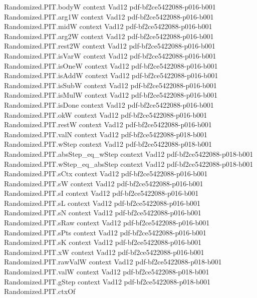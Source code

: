 \begin{theorem}
\proofstep
  {Randomized.PIT.bodyW}
  {context}
  {Vad12}
  {pdf-bf2ce5422088-p016-b001}
\proofstep
  {Randomized.PIT.arg1W}
  {context}
  {Vad12}
  {pdf-bf2ce5422088-p016-b001}
\proofstep
  {Randomized.PIT.midW}
  {context}
  {Vad12}
  {pdf-bf2ce5422088-p016-b001}
\proofstep
  {Randomized.PIT.arg2W}
  {context}
  {Vad12}
  {pdf-bf2ce5422088-p016-b001}
\proofstep
  {Randomized.PIT.rest2W}
  {context}
  {Vad12}
  {pdf-bf2ce5422088-p016-b001}
\proofstep
  {Randomized.PIT.isVarW}
  {context}
  {Vad12}
  {pdf-bf2ce5422088-p016-b001}
\proofstep
  {Randomized.PIT.isOneW}
  {context}
  {Vad12}
  {pdf-bf2ce5422088-p016-b001}
\proofstep
  {Randomized.PIT.isAddW}
  {context}
  {Vad12}
  {pdf-bf2ce5422088-p016-b001}
\proofstep
  {Randomized.PIT.isSubW}
  {context}
  {Vad12}
  {pdf-bf2ce5422088-p016-b001}
\proofstep
  {Randomized.PIT.isMulW}
  {context}
  {Vad12}
  {pdf-bf2ce5422088-p016-b001}
\proofstep
  {Randomized.PIT.isDone}
  {context}
  {Vad12}
  {pdf-bf2ce5422088-p016-b001}
\proofstep
  {Randomized.PIT.okW}
  {context}
  {Vad12}
  {pdf-bf2ce5422088-p016-b001}
\proofstep
  {Randomized.PIT.restW}
  {context}
  {Vad12}
  {pdf-bf2ce5422088-p016-b001}
\proofstep
  {Randomized.PIT.valN}
  {context}
  {Vad12}
  {pdf-bf2ce5422088-p018-b001}
\proofstep
  {Randomized.PIT.wStep}
  {context}
  {Vad12}
  {pdf-bf2ce5422088-p018-b001}
\proofstep
  {Randomized.PIT.absStep_eq_wStep}
  {context}
  {Vad12}
  {pdf-bf2ce5422088-p018-b001}
\proofstep
  {Randomized.PIT.wStep_eq_absStep}
  {context}
  {Vad12}
  {pdf-bf2ce5422088-p018-b001}
\proofstep
  {Randomized.PIT.sCtx}
  {context}
  {Vad12}
  {pdf-bf2ce5422088-p016-b001}
\proofstep
  {Randomized.PIT.sW}
  {context}
  {Vad12}
  {pdf-bf2ce5422088-p016-b001}
\proofstep
  {Randomized.PIT.sI}
  {context}
  {Vad12}
  {pdf-bf2ce5422088-p016-b001}
\proofstep
  {Randomized.PIT.sL}
  {context}
  {Vad12}
  {pdf-bf2ce5422088-p016-b001}
\proofstep
  {Randomized.PIT.sN}
  {context}
  {Vad12}
  {pdf-bf2ce5422088-p016-b001}
\proofstep
  {Randomized.PIT.sRaw}
  {context}
  {Vad12}
  {pdf-bf2ce5422088-p016-b001}
\proofstep
  {Randomized.PIT.sPts}
  {context}
  {Vad12}
  {pdf-bf2ce5422088-p016-b001}
\proofstep
  {Randomized.PIT.sK}
  {context}
  {Vad12}
  {pdf-bf2ce5422088-p016-b001}
\proofstep
  {Randomized.PIT.xW}
  {context}
  {Vad12}
  {pdf-bf2ce5422088-p016-b001}
\proofstep
  {Randomized.PIT.rawValW}
  {context}
  {Vad12}
  {pdf-bf2ce5422088-p018-b001}
\proofstep
  {Randomized.PIT.valW}
  {context}
  {Vad12}
  {pdf-bf2ce5422088-p018-b001}
\proofstep
  {Randomized.PIT.gStep}
  {context}
  {Vad12}
  {pdf-bf2ce5422088-p018-b001}
\proofstep
  {Randomized.PIT.ctxOf}

\end{theorem}
